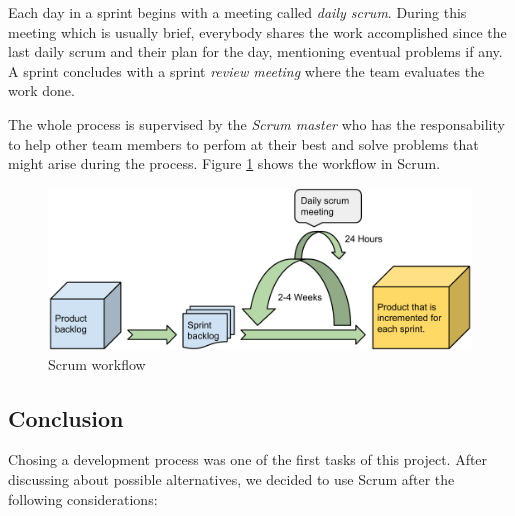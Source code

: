 Each day in a sprint begins with a meeting called \emph{daily scrum}. During this meeting which is usually brief,
everybody shares the work accomplished since the last daily scrum and their plan for the day, mentioning eventual
problems if any. A sprint concludes with a sprint \textit{review meeting} where the team evaluates the work done.

The whole process is supervised by the \textit{Scrum master} who has the responsability to help other
team members to perfom at their best and solve problems that might arise during the process.
Figure \ref{figure:scrum-workflow} shows the workflow in Scrum.

\begin{figure}[h]
\begin{center}
\includegraphics[scale=0.5]{../Figures/Scrum-workflow.pdf}
\end{center}
\caption{Scrum workflow}
\label{figure:scrum-workflow}
\end{figure}

\subsection{Conclusion}

Chosing a development process was one of the first tasks of this project.
After discussing about possible alternatives, we decided to use Scrum after the following
considerations:

